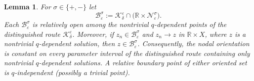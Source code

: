 \documentclass[11pt,reqno]{amsart}
\numberwithin{equation}{section}
\newtheorem{lemma}[theorem]{Lemma}
\theoremstyle{definition}
\theoremstyle{remark}
\begin{document}
\begin{lemma}\label{lem4.8}
For $\sigma\in\{+,-\}$ let
\[
 \mathscr B_\varepsilon^\sigma
 :=\mathcal K_\delta^\varepsilon\cap
 \bigl(\mathbb R\times\mathcal N_\varepsilon^\sigma\bigr).
\]
Each $\mathscr B_\varepsilon^\sigma$ is relatively open among the
nontrivial $q$-dependent points of the distinguished route
$\mathcal K_\delta^\varepsilon$.  Moreover, if
$z_n\in\mathscr B_\varepsilon^\sigma$ and $z_n\to z$ in
$\mathbb R\times X$, where $z$ is a nontrivial $q$-dependent
solution, then $z\in\mathscr B_\varepsilon^\sigma$.  Consequently,
the nodal orientation is constant on every parameter interval of the
distinguished route containing only nontrivial $q$-dependent
solutions.  A relative boundary point of either oriented set is
$q$-independent (possibly a trivial point).
\end{lemma}
\end{document}
